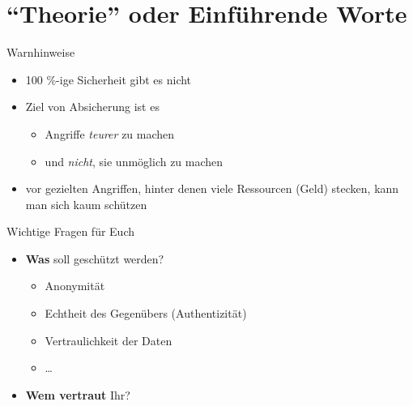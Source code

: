 \section{``Theorie'' oder Einführende Worte}
  \begin{frame}{Warnhinweise}
    \begin{itemize}
      \item 100 \%-ige Sicherheit gibt es nicht
      \item Ziel von Absicherung ist es
      \begin{itemize}
        \item Angriffe \textit{teurer} zu machen
        \item und \textit{nicht}, sie unmöglich zu machen
      \end{itemize}
      \item vor gezielten Angriffen, hinter denen viele Ressourcen (Geld) stecken, kann man sich kaum schützen
    \end{itemize}
  \end{frame}
  \begin{frame}{Wichtige Fragen für Euch}
    \begin{itemize}
      \item \textbf{Was} soll geschützt werden?
        \begin{itemize}
          \item Anonymität
          \item Echtheit des Gegenübers (Authentizität)
          \item Vertraulichkeit der Daten
          \item \ldots
        \end{itemize}
      \item \textbf{Wem vertraut} Ihr?
    \end{itemize}
  \end{frame}

